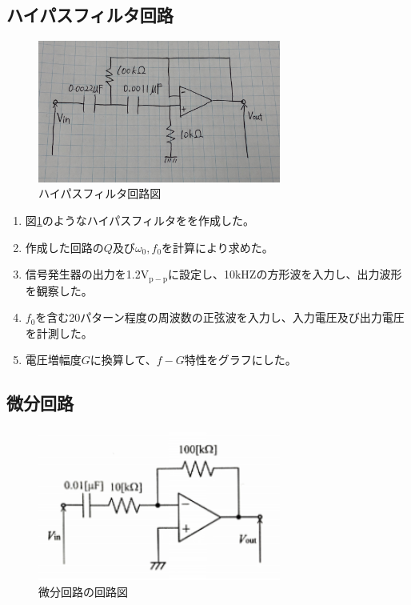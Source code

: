 \documentclass[a4paper,11pt,uplatex]{jsarticle}
\begin{document}
\subsection{ハイパスフィルタ回路}
\begin{figure}[H]
	\begin{center}
		\includegraphics[width=8cm]{画像/ハイパス1.jpg}
		\caption{ハイパスフィルタ回路図}
		\label{ハイパスフィルタ}
	\end{center}
\end{figure}

\begin{enumerate}
  \item 図\ref{ハイパスフィルタ}のようなハイパスフィルタをを作成した。
  \item 作成した回路の$Q$及び$\omega_0,f_0$を計算により求めた。
  \item 信号発生器の出力を1.2$\mathrm{V_{p-p}}$に設定し、10kHZの方形波を入力し、出力波形を観察した。
  \item $f_0$を含む20パターン程度の周波数の正弦波を入力し、入力電圧及び出力電圧を計測した。
  \item 電圧増幅度$G$に換算して、$f-G$特性をグラフにした。
\end{enumerate}

\subsection{微分回路}
\begin{figure}[H]
	\begin{center}
		\includegraphics[width=8cm]{画像/微分回路1.png}
		\caption{微分回路の回路図}
		\label{微分回路1}
	\end{center}
\end{figure}
\end{document}
